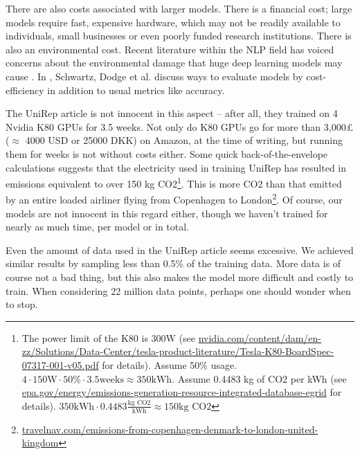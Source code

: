 \documentclass[a4paper,12pt]{article}
\begin{document}
There are also costs associated with larger models. There is a financial cost; large models require fast, expensive hardware, which may not be readily available to individuals, small businesses or even poorly funded research institutions. There is also an environmental cost. Recent literature within the NLP field has voiced concerns about the environmental damage that huge deep learning models may cause \cite{strubell2019energy}. In \cite{greenai}, Schwartz, Dodge et al. discuss ways to evaluate models by cost-efficiency in addition to usual metrics like accuracy.

The UniRep article is not innocent in this aspect -- after all, they trained on 4 Nvidia K80 GPUs for 3.5 weeks. Not only do K80 GPUs go for more than 3,000£ ($\approx$ 4000 USD or 25000 DKK) on Amazon, at the time of writing, but running them for weeks is not without costs either. Some quick back-of-the-envelope calculations suggests that the electricity used in training UniRep has resulted in emissions equivalent to over 150 kg CO2\footnote{The power limit of the K80 is 300W (see \url{nvidia.com/content/dam/en-zz/Solutions/Data-Center/tesla-product-literature/Tesla-K80-BoardSpec-07317-001-v05.pdf} for details). Assume 50\% usage. $4 \cdot 150\text{W} \cdot 50\% \cdot 3.5\text{weeks} \approx 350\text{kWh}$. Assume 0.4483 kg of CO2 per kWh (see \url{epa.gov/energy/emissions-generation-resource-integrated-database-egrid} for details). $350\text{kWh} \cdot 0.4483 \frac{\text{kg CO2}}{\text{kWh}} \approx 150 \text{kg CO2}$}. This is more CO2 than that emitted by an entire loaded airliner flying from Copenhagen to London\footnote{\url{travelnav.com/emissions-from-copenhagen-denmark-to-london-united-kingdom}}. Of course, our models are not innocent in this regard either, though we haven't trained for nearly as much time, per model or in total.

Even the amount of data used in the UniRep article seems excessive. We achieved similar results by sampling less than 0.5\% of the training data. More data is of course not a bad thing, but this also makes the model more difficult and costly to train. When considering 22 million data points, perhaps one should wonder when to stop.

\clearpage
\end{document}
